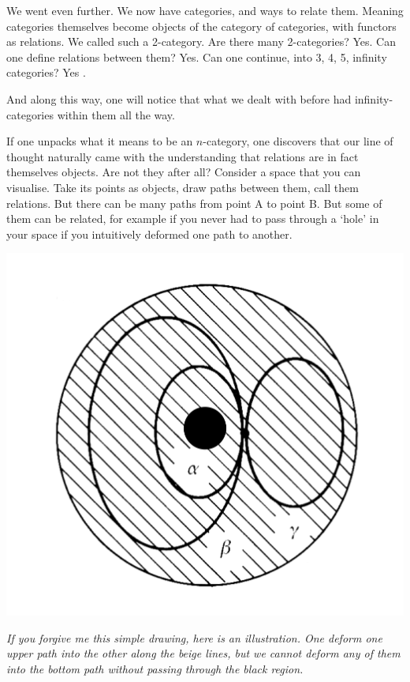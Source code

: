 \documentclass{article}
\begin{document}
We went even further. We now have categories, and ways to relate them. Meaning categories themselves become objects of the category of categories, with functors as relations. We called such a 2-category. Are there many 2-categories? Yes. Can one define relations between them? Yes. Can one continue, into 3, 4, 5, infinity categories? Yes \cite{BAEZ, NLABINFTY}.

And along this way, one will notice that what we dealt with before had infinity-categories within them all the way.

If one unpacks what it means to be an $n$-category, one discovers that our line of thought naturally came with the understanding that relations are in fact themselves objects. Are not they after all? Consider a space that you can visualise. Take its points as objects, draw paths between them, call them relations. But there can be many paths from point A to point B. But some of them can be related, for example if you never had to pass through a ‘hole’ in your space if you intuitively deformed one path to another.

\begin{center}
\includegraphics[scale=0.12]{paths}

\textit{If you forgive me this simple drawing, here is an illustration. One deform one upper path into the other along the beige lines, but we cannot deform any of them into the bottom path without passing through the black region.}
\end{center}
\end{document}
